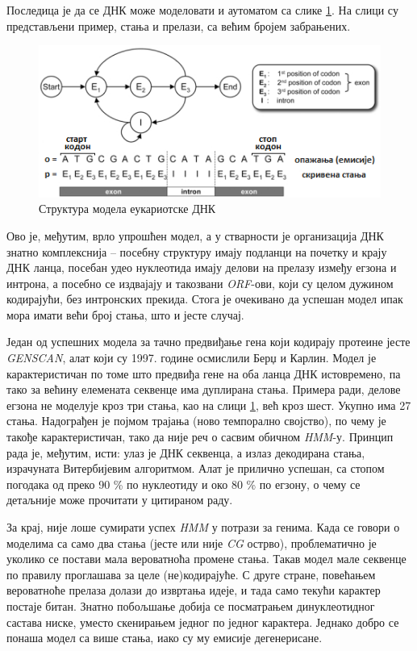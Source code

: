 \documentclass[12pt,oneside]{memoir}
\begin{document}
\begin{CJK}{UTF8}{ipxm}
Последица је да се ДНК може моделовати и аутоматом са слике \ref{fig:eukariote}. На слици су представљени пример, стања и прелази, са већим бројем забрањених.

\begin{figure}[H]
  \centering
  \includegraphics[width=.85\textwidth]{eukariote.png}
  \caption{Структура модела еукариотске ДНК\cite{eukary}}
  \label{fig:eukariote}
\end{figure}

Ово је, међутим, врло упрошћен модел, а у стварности је организација ДНК знатно комплекснија -- посебну структуру имају подланци на почетку и крају ДНК ланца, посебан удео нуклеотида имају делови на прелазу између егзона и интрона, а посебно се издвајају и такозвани \textit{ORF}-ови, који су целом дужином кодирајући, без интронских прекида\cite{henderson1997, huson2020}. Стога је очекивано да успешан модел ипак мора имати већи број стања, што и јесте случај.

Један од успешних модела за тачно предвиђање гена који кодирају протеине јесте \textit{GENSCAN}, алат који су 1997. године осмислили Берџ и Карлин\cite{genscan, burge1997}. Модел је карактеристичан по томе што предвиђа гене на оба ланца ДНК истовремено, па тако за већину елемената секвенце има дуплирана стања. Примера ради, делове егзона не моделује кроз три стања, као на слици \ref{fig:eukariote}, већ кроз шест. Укупно има 27 стања. Надограђен је појмом трајања (ново темпорално својство), по чему је такође карактеристичан, тако да није реч о сасвим обичном \textit{HMM}-у. Принцип рада је, међутим, исти: улаз је ДНК секвенца, а излаз декодирана стања, израчуната Витербијевим алгоритмом. Алат је прилично успешан, са стопом погодака од преко 90 \% по нуклеотиду и око 80 \% по егзону, о чему се детаљније може прочитати у цитираном раду.

За крај, није лоше сумирати успех \textit{HMM} у потрази за генима. Када се говори о моделима са само два стања (јесте или није \textit{CG} острво), проблематично је уколико се постави мала вероватноћа промене стања. Такав модел мале секвенце по правилу проглашава за целе (не)кодирајуће. С друге стране, повећањем вероватноће прелаза долази до извртања идеје, и тада само текући карактер постаје битан. Знатно побољшање добија се посматрањем динуклеотидног састава ниске, уместо скенирањем једног по једног карактера. Једнако добро се понаша модел са више стања, иако су му емисије дегенерисане.


\end{CJK}
\end{document}
